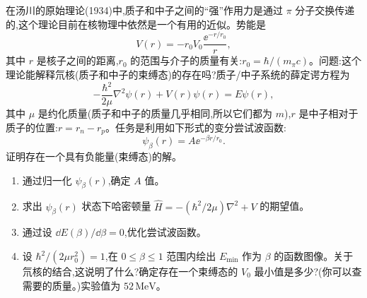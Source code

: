 \begin{question}
在汤川的原始理论(1934)中,质子和中子之间的“强”作用力是通过 $\pi$ 分子交换传递的,这个理论目前在核物理中依然是一个有用的近似。势能是
\[
V(r)=-r_0V_0\frac{\ee^{-r/r_0}}{r},
\]
其中 $r$ 是核子之间的距离,$r_0$ 的范围与介子的质量有关:$r_0=\hbar/(m_\pi c)$。问题:这个理论能解释氘核(质子和中子的束缚态)的存在吗?质子/中子系统的薛定谔方程为
\[
-\frac{\hbar^2}{2\mu}\nabla^2\psi(r)+V(r)\psi(r)=E\psi(r),
\]
其中 $\mu$ 是约化质量(质子和中子的质量几乎相同,所以它们都为 $m$),$r$ 是中子相对于质子的位置:$r=r_n-r_p$。任务是利用如下形式的变分尝试波函数:
\[
\psi_\beta(r)=A\ee^{-\beta r/r_0}.
\]
证明存在一个具有负能量(束缚态)的解。
\begin{enumerate}
\item 通过归一化 $\psi_\beta(r)$,确定 $A$ 值。
\item 求出 $\psi_\beta(r)$ 状态下哈密顿量 $\hat H=-(\hbar^2/2\mu)\nabla^2+V$ 的期望值。
\item 通过设 $\dd E(\beta)/\dd\beta=0$,优化尝试波函数。
\item 设 $\hbar^2/(2\mu r_0^2)=1$,在 $0\le\beta\le1$ 范围内绘出 $E_{\min}$ 作为 $\beta$ 的函数图像。关于氘核的结合,这说明了什么?确定存在一个束缚态的 $V_0$ 最小值是多少?(你可以查需要的质量。)实验值为 $52\,\mathrm{MeV}$。
\end{enumerate}
\end{question}
